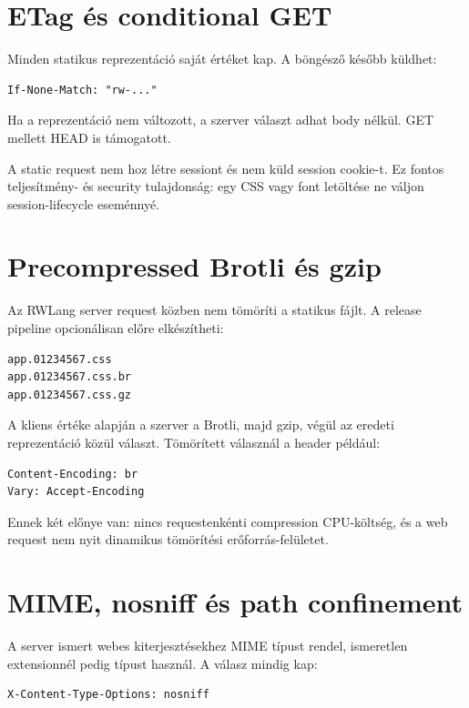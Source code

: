 \section{ETag és conditional GET}

Minden statikus reprezentáció saját  értéket kap. A böngésző később küldhet:

\begin{lstlisting}
If-None-Match: "rw-..."
\end{lstlisting}

Ha a reprezentáció nem változott, a szerver  választ adhat body nélkül. GET mellett HEAD is támogatott.

A static request nem hoz létre sessiont és nem küld session cookie-t. Ez fontos teljesítmény- és security tulajdonság: egy CSS vagy font letöltése ne váljon session-lifecycle eseménnyé.

\section{Precompressed Brotli és gzip}

Az RWLang server request közben nem tömöríti a statikus fájlt. A release pipeline opcionálisan előre elkészítheti:

\begin{lstlisting}
app.01234567.css
app.01234567.css.br
app.01234567.css.gz
\end{lstlisting}

A kliens  értéke alapján a szerver a Brotli, majd gzip, végül az eredeti reprezentáció közül választ. Tömörített válasznál a header például:

\begin{lstlisting}
Content-Encoding: br
Vary: Accept-Encoding
\end{lstlisting}

Ennek két előnye van: nincs requestenkénti compression CPU-költség, és a web request nem nyit dinamikus tömörítési erőforrás-felületet.

\section{MIME, nosniff és path confinement}

A server ismert webes kiterjesztésekhez MIME típust rendel, ismeretlen extensionnél pedig  típust használ. A válasz mindig kap:

\begin{lstlisting}
X-Content-Type-Options: nosniff
\end{lstlisting}

